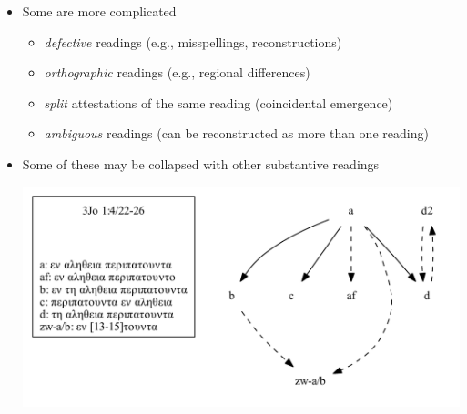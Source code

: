 \documentclass[10pt]{beamer}
\begin{document}
	\begin{frame}
		\begin{itemize}
			\item Some are more complicated
			\begin{itemize}
				\item \emph{defective} readings (e.g., misspellings, reconstructions)
				\item \emph{orthographic} readings (e.g., regional differences)
				\item \emph{split} attestations of the same reading (coincidental emergence)
				\item \emph{ambiguous} readings (can be reconstructed as more than one reading)
			\end{itemize}
			\item Some of these may be collapsed with other substantive readings
			\begin{center}
				\includegraphics[scale=0.5]{../img/B25K1V4U22-26-local-stemma-ignore-defective-ignore-ambiguous-merge-splits.pdf}
			\end{center}
		\end{itemize}
	\end{frame}
\end{document}
